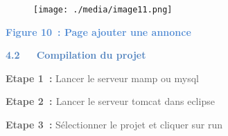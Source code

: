\documentclass[12pt]{report}
\begin{document}
\begin{enumerate}[label*={\fontsize{18pt}{18pt}\selectfont \textbf{\arabic*.}}]
\begin{figure}[H]
\begin{Center}	
    \texttt{[image: ./media/image11.png]}
\end{Center}  
\end{figure}

\begin{Center}
\textbf{\textcolor[HTML]{548DD4}{Figure 10 : Page ajouter une annonce}}
\end{Center}\par


\vspace{\baselineskip}

\vspace{\baselineskip}
{\fontsize{14pt}{16.8pt}\selectfont \textbf{\textcolor[HTML]{4F81BD}{4.2\ \ \  Compilation du projet}}\par}\par

\textbf{\textcolor[HTML]{595959}{Etape 1 :}}\textcolor[HTML]{595959}{ Lancer le serveur mamp ou mysql }\par

\textbf{\textcolor[HTML]{595959}{Etape 2 : }}\textcolor[HTML]{595959}{Lancer le serveur tomcat dans eclipse }\par

\textbf{\textcolor[HTML]{595959}{Etape 3 :}}\textcolor[HTML]{595959}{ Sélectionner le projet et cliquer sur run\ \  }\par


\vspace{\baselineskip}
\setlength{\parskip}{9.96pt}

\end{enumerate}
\printbibliography
\end{document}
